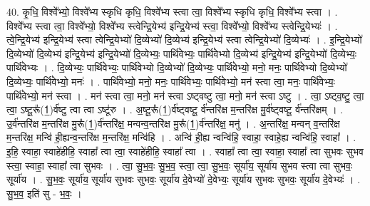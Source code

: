\documentclass[17pt]{extarticle}
\begin{document}
40. कृ॒धि॒ विश्वे᳚भ्यो॒ विश्वे᳚भ्य स्कृधि कृधि॒ विश्वे᳚भ्य स्त्वा त्वा॒ विश्वे᳚भ्य स्कृधि कृधि॒ विश्वे᳚भ्य स्त्वा । . विश्वे᳚भ्य स्त्वा त्वा॒ विश्वे᳚भ्यो॒ विश्वे᳚भ्य स्त्वेन्द्रि॒येभ्य॑ इन्द्रि॒येभ्य॑ स्त्वा॒ विश्वे᳚भ्यो॒ विश्वे᳚भ्य स्त्वेन्द्रि॒येभ्यः॑ । . त्वे॒न्द्रि॒येभ्य॑ इन्द्रि॒येभ्य॑ स्त्वा त्वेन्द्रि॒येभ्यो॑ दि॒व्येभ्यो॑ दि॒व्येभ्य॑ इन्द्रि॒येभ्य॑ स्त्वा त्वेन्द्रि॒येभ्यो॑ दि॒व्येभ्यः॑ । . इ॒न्द्रि॒येभ्यो॑ दि॒व्येभ्यो॑ दि॒व्येभ्य॑ इन्द्रि॒येभ्य॑ इन्द्रि॒येभ्यो॑ दि॒व्येभ्यः॒ पार्थि॑वेभ्यः॒ पार्थि॑वेभ्यो दि॒व्येभ्य॑ इन्द्रि॒येभ्य॑ इन्द्रि॒येभ्यो॑ दि॒व्येभ्यः॒ पार्थि॑वेभ्यः । . दि॒व्येभ्यः॒ पार्थि॑वेभ्यः॒ पार्थि॑वेभ्यो दि॒व्येभ्यो॑ दि॒व्येभ्यः॒ पार्थि॑वेभ्यो॒ मनो॒ मनः॒ पार्थि॑वेभ्यो दि॒व्येभ्यो॑ दि॒व्येभ्यः॒ पार्थि॑वेभ्यो॒ मनः॑ । . पार्थि॑वेभ्यो॒ मनो॒ मनः॒ पार्थि॑वेभ्यः॒ पार्थि॑वेभ्यो॒ मन॑ स्त्वा त्वा॒ मनः॒ पार्थि॑वेभ्यः॒ पार्थि॑वेभ्यो॒ मन॑ स्त्वा । . मन॑ स्त्वा त्वा॒ मनो॒ मन॑ स्त्वा ऽष्ट्वष्टु त्वा॒ मनो॒ मन॑ स्त्वा ऽष्टु । . त्वा॒ ऽष्ट्व॒ष्टु॒ त्वा॒ त्वा॒ ऽष्टू॒रू᳚(1॒)र्व॑ष्टु त्वा त्वा ऽष्टू॑रु । . अ॒ष्टू॒रू᳚(1॒)र्व॑ष्ट्वष्टू॒ र्व॑न्तरि॑क्ष म॒न्तरि॑क्ष मु॒र्व॑ष्ट्वष्टू॒ र्व॑न्तरि॑क्षम् । . उ॒र्व॑न्तरि॑क्ष म॒न्तरि॑क्ष मु॒रू᳚(1॒)र्व॑न्तरि॑क्ष॒ मन्वन्व॒न्तरि॑क्ष मु॒रू᳚(1॒)र्व॑न्तरि॑क्ष॒ मनु॑ । . अ॒न्तरि॑क्ष॒ मन्वन् व॒न्तरि॑क्ष म॒न्तरि॑क्ष॒ मन्वि॑ ही॒ह्यन्व॒न्तरि॑क्ष म॒न्तरि॑क्ष॒ मन्वि॑हि । . अन्वि॑ ही॒ह्य न्वन्वि॑हि॒ स्वाहा॒ स्वाहे॒ह्य न्वन्वि॑हि॒ स्वाहा᳚ । . इ॒हि॒ स्वाहा॒ स्वाहे॑हीहि॒ स्वाहा᳚ त्वा त्वा॒ स्वाहे॑हीहि॒ स्वाहा᳚ त्वा । . स्वाहा᳚ त्वा त्वा॒ स्वाहा॒ स्वाहा᳚ त्वा सुभवः सुभव स्त्वा॒ स्वाहा॒ स्वाहा᳚ त्वा सुभवः । . त्वा॒ सु॒भ॒वः॒ सु॒भ॒व॒ स्त्वा॒ त्वा॒ सु॒भ॒वः॒ सूर्या॑य॒ सूर्या॑य सुभव स्त्वा त्वा सुभवः॒ सूर्या॑य । . सु॒भ॒वः॒ सूर्या॑य॒ सूर्या॑य सुभवः सुभवः॒ सूर्या॑य दे॒वेभ्यो॑ दे॒वेभ्यः॒ सूर्या॑य सुभवः सुभवः॒ सूर्या॑य दे॒वेभ्यः॑ । . सु॒भ॒व॒ इति॑ सु - भ॒वः॒ । \newline
\end{document}
